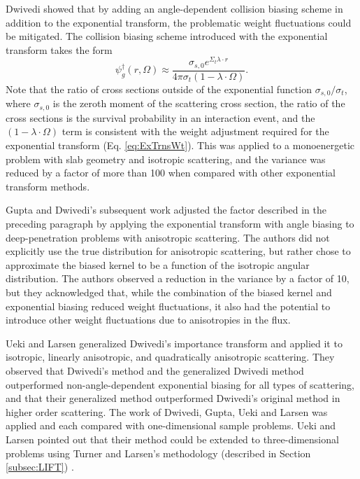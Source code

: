 Dwivedi \cite{dwivedi_new_1982} showed that by adding an angle-dependent collision
biasing scheme in addition to the exponential transform, the problematic weight
fluctuations could be mitigated. The collision biasing scheme introduced with
the exponential transform takes the form
\begin{equation}
  \psi_g^{\dagger}(r, \Omega) \approx \frac{\sigma_{s,0} e^{\Sigma_t\lambda \cdot r}}
  {4 \pi \sigma_t (1 - \lambda \cdot \Omega)}.
  \label{eq:DwivediTrns}
\end{equation}
Note that the ratio of cross sections outside of the exponential function
$\sigma_{s,0} / \sigma_t$, where $\sigma_{s,0}$ is the zeroth moment of the
scattering cross section, the ratio of the cross sections
is the survival probability in an interaction event, and
the $(1 - \lambda \cdot \Omega)$ term is consistent with the weight adjustment
required for the exponential transform (Eq. \eqref{eq:ExTrnsWt}).
This was applied to a monoenergetic problem
with slab geometry and isotropic scattering, and the variance was reduced by a
factor of more than 100 when compared with other exponential transform methods.

Gupta and Dwivedi's subsequent work \cite{gupta_sampling_1985} adjusted the
factor described in the preceding paragraph by applying the
exponential transform with angle biasing to deep-penetration problems with
anisotropic scattering. The authors did not explicitly use the
true distribution for anisotropic scattering, but rather chose to approximate
the biased kernel to be a function of the isotropic angular distribution. The
authors observed a reduction in the variance by a factor of 10, but they
acknowledged that, while the combination of the biased kernel and exponential
biasing reduced weight fluctuations, it also had the potential to introduce
other weight fluctuations due to anisotropies in the flux.

Ueki and Larsen \cite{ueki_kinetic_1998}
generalized Dwivedi's importance transform and applied it to
isotropic, linearly anisotropic, and quadratically anisotropic scattering. They
observed that Dwivedi's method and the generalized Dwivedi method outperformed
non-angle-dependent exponential biasing for all types of scattering,
and that their generalized method
outperformed Dwivedi's original method in higher order scattering. The work
of Dwivedi, Gupta, Ueki and Larsen was applied and each compared with
one-dimensional sample
problems. Ueki and Larsen pointed out that their method could be extended to
three-dimensional problems using Turner and Larsen's methodology
(described in Section \ref{subsec:LIFT})
\cite{ueki_kinetic_1998}.

